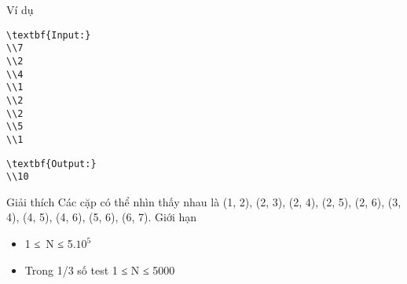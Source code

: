 Ví dụ  
\begin{verbatim}
\textbf{Input:}
\\7
\\2
\\4
\\1
\\2
\\2
\\5
\\1 \end{verbatim}
\begin{verbatim}
\textbf{Output:}
\\10\end{verbatim}
   Giải thích  
Các cặp có thể nhìn thấy nhau là (1, 2), (2, 3), (2, 4), (2, 5), (2, 6), (3, 4), (4, 5), (4, 6), (5, 6), (6, 7).
   Giới hạn  
\begin{itemize}
	\item     1 ≤ N ≤ 5.$10^{5}$
	\item     Trong 1/3 số test 1 ≤ N ≤ 5000   
\end{itemize}